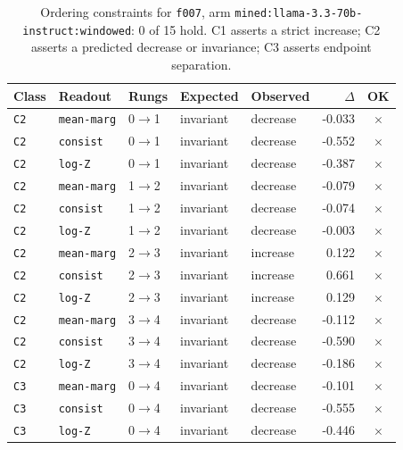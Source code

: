 \documentclass[11pt]{article}
\begin{document}
\begin{table}[htbp]
\centering
\small
\caption{Ordering constraints for \texttt{f007}, arm \texttt{mined:llama-3.3-70b-instruct:windowed}: 0 of 15 hold. C1 asserts a strict increase; C2 asserts a predicted decrease or invariance; C3 asserts endpoint separation.}
\label{tab:ladder-f007-mined-llama-3-3-70b-instruct-windowed}
\begin{tabular}{lllllrc}
\toprule
Class & Readout & Rungs & Expected & Observed & $\Delta$ & OK \\
\midrule
\texttt{C2} & \texttt{mean-marg} & 0$\to$1 & invariant & decrease & -0.033 & $\times$ \\
\texttt{C2} & \texttt{consist} & 0$\to$1 & invariant & decrease & -0.552 & $\times$ \\
\texttt{C2} & \texttt{log-Z} & 0$\to$1 & invariant & decrease & -0.387 & $\times$ \\
\texttt{C2} & \texttt{mean-marg} & 1$\to$2 & invariant & decrease & -0.079 & $\times$ \\
\texttt{C2} & \texttt{consist} & 1$\to$2 & invariant & decrease & -0.074 & $\times$ \\
\texttt{C2} & \texttt{log-Z} & 1$\to$2 & invariant & decrease & -0.003 & $\times$ \\
\texttt{C2} & \texttt{mean-marg} & 2$\to$3 & invariant & increase & 0.122 & $\times$ \\
\texttt{C2} & \texttt{consist} & 2$\to$3 & invariant & increase & 0.661 & $\times$ \\
\texttt{C2} & \texttt{log-Z} & 2$\to$3 & invariant & increase & 0.129 & $\times$ \\
\texttt{C2} & \texttt{mean-marg} & 3$\to$4 & invariant & decrease & -0.112 & $\times$ \\
\texttt{C2} & \texttt{consist} & 3$\to$4 & invariant & decrease & -0.590 & $\times$ \\
\texttt{C2} & \texttt{log-Z} & 3$\to$4 & invariant & decrease & -0.186 & $\times$ \\
\texttt{C3} & \texttt{mean-marg} & 0$\to$4 & invariant & decrease & -0.101 & $\times$ \\
\texttt{C3} & \texttt{consist} & 0$\to$4 & invariant & decrease & -0.555 & $\times$ \\
\texttt{C3} & \texttt{log-Z} & 0$\to$4 & invariant & decrease & -0.446 & $\times$ \\
\bottomrule
\end{tabular}
\end{table}
\end{document}
